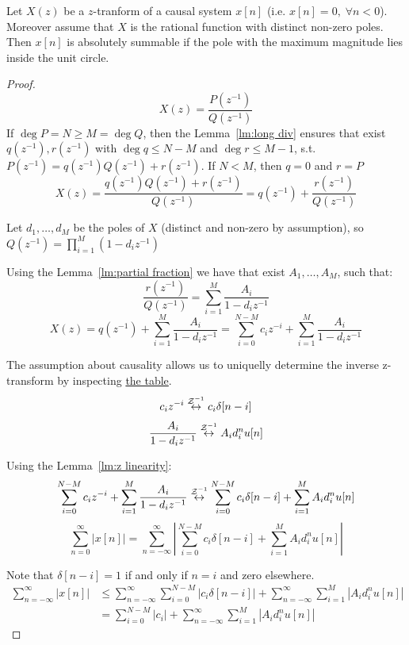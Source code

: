 \begin{theorem} \label{thm:stability}
    Let $X(z)$ be a $z$-tranform of a causal system $x[n]$ (i.e. $x[n] = 0, \; \forall n<0$). Moreover assume that $X$ is the rational function with distinct non-zero poles. Then $x[n]$ is absolutely summable if the pole with the maximum magnitude lies inside the unit circle.
\end{theorem}
\begin{proof}
    \[X(z) = \frac{P(z^{-1})}{Q(z^{-1})}\]
    If $\deg P = N \geq M = \deg Q$, then the Lemma~\ref{lm:long div} ensures that exist $q(z^{-1}), r(z^{-1})$ with $\deg q \leq N-M$ and $\deg r \leq M-1$, s.t. $P(z^{-1}) = q(z^{-1})Q(z^{-1}) + r(z^{-1})$. If $N < M$, then $q = 0$ and $r = P$
    \[X(z)
        = \frac{q(z^{-1})Q(z^{-1}) + r(z^{-1})}{Q(z^{-1})}
        = q(z^{-1}) + \frac{r(z^{-1})}{Q(z^{-1})}\]

    Let $d_1, \dots, d_M$ be the poles of $X$ (distinct and non-zero by assumption), so $Q(z^{-1}) = \prod_{i=1}^{M} (1 - d_iz^{-1})$

    Using the Lemma~\ref{lm:partial fraction} we have that exist $A_1, \dots, A_M$, such that:
    \[\frac{r(z^{-1})}{Q(z^{-1})}
        = \sum_{i=1}^{M} \frac{A_i}{1 - d_iz^{-1}}\]
    \[X(z)
        = q(z^{-1}) + \sum_{i=1}^{M} \frac{A_i}{1 - d_iz^{-1}}
        = \sum_{i = 0}^{N-M} c_i z^{-i} + \sum_{i=1}^{M} \frac{A_i}{1 - d_iz^{-1}}\]

    The assumption about causality allows us to uniquelly determine the inverse z-transform by inspecting \href{https://en.wikipedia.org/wiki/Z-transform#Table_of_common_Z-transform_pairs}{the table}.
    \[c_i z^{-i} \overset{\mathcal{Z}^{-1}}{\leftrightarrow} c_i\delta[n-i]\]
    \[\frac{A_i}{1 - d_iz^{-1}} \overset{\mathcal{Z}^{-1}}{\leftrightarrow} A_i d_i^n u[n]\]

    Using the Lemma~\ref{lm:z linearity}:
    \[\sum_{i = 0}^{N-M} c_i z^{-i} + \sum_{i=1}^{M} \frac{A_i}{1 - d_iz^{-1}} \overset{\mathcal{Z}^{-1}}{\leftrightarrow}
        \sum_{i = 0}^{N-M} c_i\delta[n-i] + \sum_{i=1}^{M} A_i d_i^n u[n]\]
    \[\sum_{n=0}^{\infty} |x[n]|
        = \sum_{n=-\infty}^{\infty} \left|\sum_{i = 0}^{N-M} c_i\delta[n-i] + \sum_{i=1}^{M} A_i d_i^n u[n] \right|\]

    Note that $\delta[n-i] = 1$ if and only if $n = i$ and zero elsewhere.
    \begin{align*}
        \sum_{n=-\infty}^{\infty} |x[n]| & \leq
        \sum_{n=-\infty}^{\infty} \sum_{i = 0}^{N-M} |c_i\delta[n-i]| + \sum_{n=-\infty}^{\infty} \sum_{i=1}^{M} |A_i d_i^n u[n] |
        \\ &= \sum_{i = 0}^{N-M} |c_i| + \sum_{n=-\infty}^{\infty} \sum_{i=1}^{M} |A_i d_i^n u[n]|
    \end{align*}


\end{proof}

